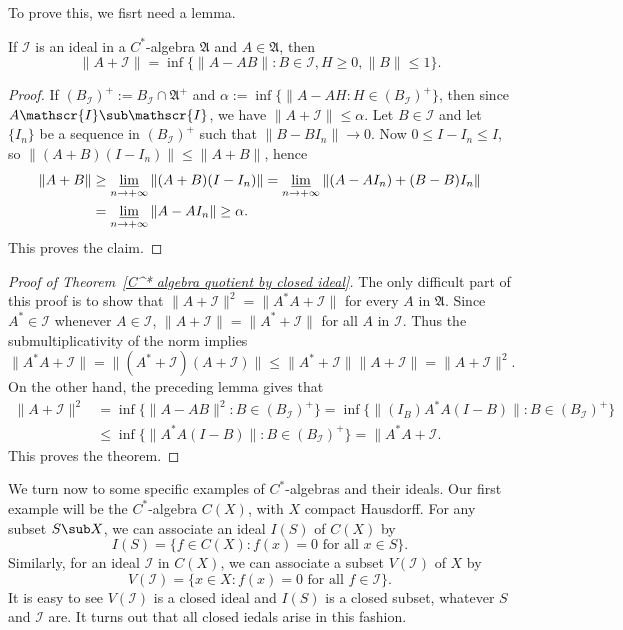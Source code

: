 To prove this, we fisrt need a lemma.
\begin{lemma}
If $\mathscr{I}$ is an ideal in a $C^*$-algebra $\mathfrak{A}$ and $A\in\mathfrak{A}$, then
\[\|A+\mathscr{I}\|=\inf\{\|A-AB\|:B\in\mathscr{I},H\geq 0,\|B\|\leq 1\}.\]
\end{lemma}
\begin{proof}
If $(B_{\mathscr{I}})^+:=B_{\mathscr{I}}\cap\mathfrak{A}^+$ and $\alpha:=\inf\{\|A-AH:H\in(B_{\mathscr{I}})^+\}$, then since $A\mathscr{I}\sub\mathscr{I}$, we have $\|A+\mathscr{I}\|\leq\alpha$. Let $B\in\mathscr{I}$ and let $\{I_n\}$ be a sequence in $(B_{\mathscr{I}})^+$ such that $\|B-BI_n\|\to 0$. Now $0\leq I-I_n\leq I$, so $\|(A+B)(I-I_n)\|\leq\|A+B\|$, hence
\begin{align*}
\|A+B\|&\geq\varliminf_{n\to+\infty}\|(A+B)(I-I_n)\|=\varliminf_{n\to+\infty}\|(A-AI_n)+(B-B)I_n\|\\
&=\varliminf_{n\to+\infty}\|A-AI_n\|\geq\alpha.
\end{align*}
This proves the claim.
\end{proof}
\begin{proof}[Proof of Theorem~\ref{C^* algebra quotient by closed ideal}]
The only difficult part of this proof is to show that $\|A+\mathscr{I}\|^2=\|A^*A+\mathscr{I}\|$ for every $A$ in $\mathfrak{A}$. Since $A^*\in\mathscr{I}$ whenever $A\in\mathscr{I}$, $\|A+\mathscr{I}\|=\|A^*+\mathscr{I}\|$ for all $A$ in $\mathscr{I}$. Thus the submultiplicativity of the norm implies
\[\|A^*A+\mathscr{I}\|=\|(A^*+\mathscr{I})(A+\mathscr{I})\|\leq\|A^*+\mathscr{I}\|\|A+\mathscr{I}\|=\|A+\mathscr{I}\|^2.\]
On the other hand, the preceding lemma gives that
\begin{align*}
\|A+\mathscr{I}\|^2&=\inf\{\|A-AB\|^2:B\in(B_{\mathscr{I}})^+\}=\inf\{\|(I_B)A^*A(I-B)\|:B\in(B_{\mathscr{I}})^+\}\\
&\leq\inf\{\|A^*A(I-B)\|:B\in(B_{\mathscr{I}})^+\}=\|A^*A+\mathscr{I}.
\end{align*}
This proves the theorem.
\end{proof}
We turn now to some specific examples of $C^*$-algebras and their ideals. Our first example will be the $C^*$-algebra $C(X)$, with $X$ compact Hausdorff. For any subset $S\sub X$, we can associate an ideal $I(S)$ of $C(X)$ by
\[I(S)=\{f\in C(X):f(x)=0\text{ for all $x\in S$}\}.\]
Similarly, for an ideal $\mathscr{I}$ in $C(X)$, we can associate a subset $V(\mathscr{I})$ of $X$ by
\[V(\mathscr{I})=\{x\in X:f(x)=0\text{ for all $f\in\mathscr{I}$}\}.\]
It is easy to see $V(\mathscr{I})$ is a closed ideal and $I(S)$ is a closed subset, whatever $S$ and $\mathscr{I}$ are. It turns out that all closed iedals arise in this fashion.
